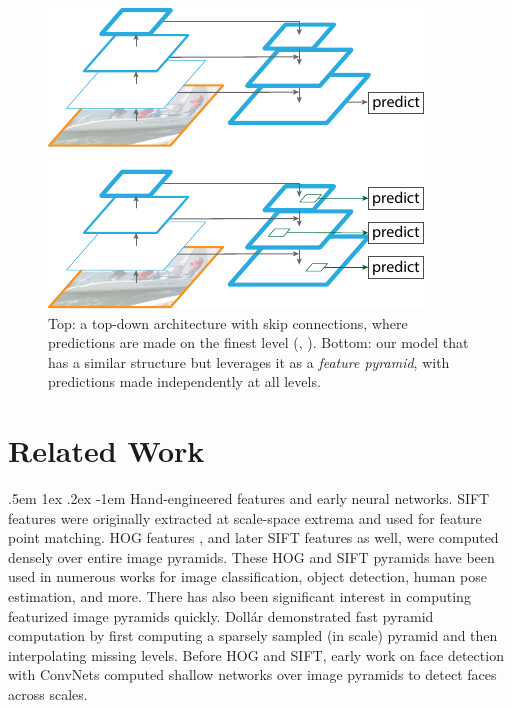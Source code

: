 \documentclass[10pt,twocolumn,letterpaper]{article}
\makeatletter
\renewcommand\paragraph{\@startsection{paragraph}{4}{\z@}%
  {.5em \@plus1ex \@minus.2ex}%
  {-1em}%
  {\normalfont\normalsize\bfseries}}
\makeatother
\begin{document}
\begin{figure}[t]
\centering
\includegraphics[width=0.74\linewidth]{ai/multilevel}
\caption{Top: a top-down architecture with skip connections, where predictions are made on the finest level (\eg, \cite{Pinheiro2016}). Bottom: our model that has a similar structure but leverages it as a \emph{feature pyramid}, with predictions made independently at all levels.}
\label{fig:multilevel}
\end{figure}

\section{Related Work}

\paragraph{Hand-engineered features and early neural networks.}
SIFT features \cite{Lowe2004} were originally extracted at scale-space extrema and used for feature point matching.
HOG features \cite{Dalal2005}, and later SIFT features as well, were computed densely over entire image pyramids.
These HOG and SIFT pyramids have been used in numerous works for image classification, object detection, human pose estimation, and more.
There has also been significant interest in computing featurized image pyramids quickly.
Doll{\'a}r \etal \cite{Dollar2014} demonstrated fast pyramid computation by first computing a sparsely sampled (in scale) pyramid and then interpolating missing levels.
Before HOG and SIFT, early work on face detection with ConvNets \cite{Lecun94,Rowley95} computed shallow networks over image pyramids to detect faces across scales.
\end{document}
